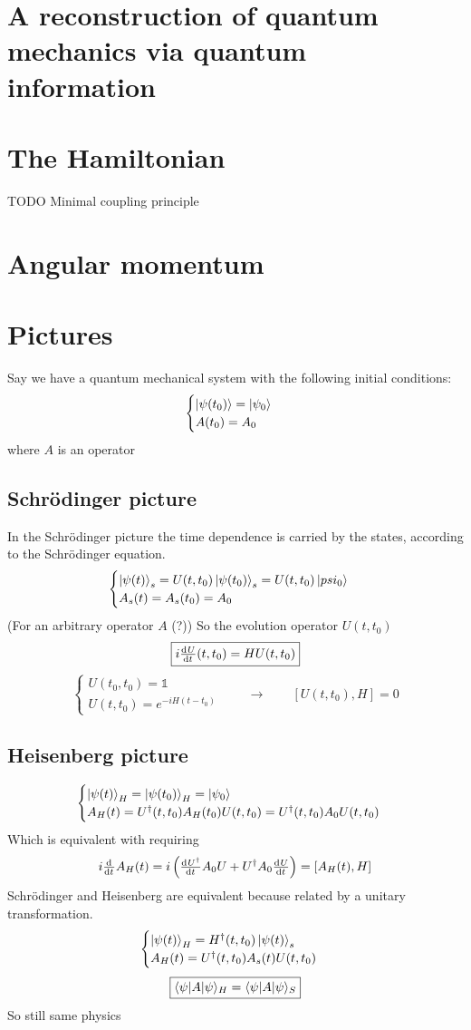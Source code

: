 \section{A reconstruction of quantum mechanics via quantum information}



\section{The Hamiltonian}
TODO Minimal coupling principle
\section{Angular momentum}
\section{Pictures}
Say we have a quantum mechanical system with the following initial conditions:
\[ \begin{cases}
\left| \psi(t_0) \right\rangle = \left| \psi_0 \right\rangle \\
A(t_0) = A_0
\end{cases} \]
where $A$ is an operator

\subsection{Schrödinger picture}
In the Schrödinger picture the time dependence is carried by the states, according to the Schrödinger equation.  
\[ \begin{cases}
\left| \psi(t) \right\rangle_s = U(t,t_0)\left| \psi(t_0) \right\rangle_s = U(t,t_0)\left| psi_0 \right\rangle \\
A_s(t) = A_s(t_0) = A_0
\end{cases} \]
(For an arbitrary operator $A$ (?))
So the evolution operator $U(t,t_0)$
\[ \boxed{i \od{U}{t}(t,t_0) = HU(t,t_0)} \]
\[ \begin{cases}
U(t_0,t_0) = \mathbb{1}\\
U(t,t_0) = e^{-iH(t-t_0)}
\end{cases} \qquad \to \qquad \left[U(t,t_0), H\right] = 0\]

\subsection{Heisenberg picture}
\[ \begin{cases}
\left| \psi(t) \right\rangle_H = \left| \psi(t_0) \right\rangle_H = \left| \psi_0 \right\rangle \\
A_H(t) = U^\dagger(t,t_0)A_H(t_0)U(t,t_0) = U^\dagger(t,t_0)A_0U(t,t_0)
\end{cases} \]
Which is equivalent with requiring
\[ i \od{}{t}A_H(t) = i \left(\od{U^\dagger}{t}A_0U+U^\dagger A_0 \od{U}{t}\right) = \left[A_H(t), H\right] \]
Schrödinger and Heisenberg are equivalent because related by a unitary transformation.
\[ \begin{cases}
\left| \psi(t) \right\rangle_H = H^\dagger(t,t_0)\left| \psi(t) \right\rangle_s \\
A_H(t) = U^\dagger(t,t_0)A_s(t)U(t,t_0)
\end{cases} \]
\[ \boxed{\braket[A]{\psi}{\psi}_H = \braket[A]{\psi}{\psi}_S} \]
So still same physics


